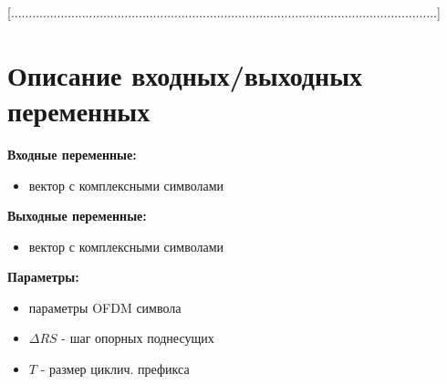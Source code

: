 [........................................................................................................................]


\section{Описание входных/выходных переменных}

\textbf{Входные переменные:}
\begin{itemize}
\item вектор с комплексными символами
\end{itemize}

\textbf{Выходные переменные:}
\begin{itemize}
\item вектор с комплексными символами
\end{itemize}

\textbf{Параметры:}
\begin{itemize}
\item параметры OFDM символа
\item $\Delta{RS}$ - шаг опорных поднесущих
\item $T$ - размер циклич. префикса
\end{itemize}

\endinput
